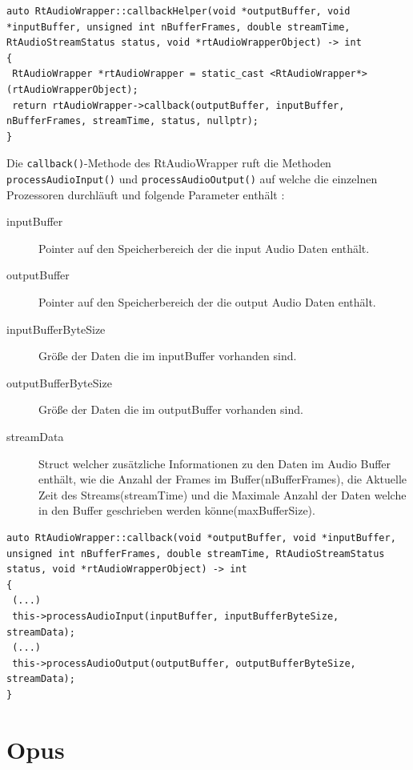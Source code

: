 \begin{lstlisting}[caption={\texttt{callbackHelper()}-Methode im RtAudioWrapper},label={Code:RtAudio CallbackHelper}]
auto RtAudioWrapper::callbackHelper(void *outputBuffer, void *inputBuffer, unsigned int nBufferFrames, double streamTime, RtAudioStreamStatus status, void *rtAudioWrapperObject) -> int
{
 RtAudioWrapper *rtAudioWrapper = static_cast <RtAudioWrapper*> (rtAudioWrapperObject);
 return rtAudioWrapper->callback(outputBuffer, inputBuffer, nBufferFrames, streamTime, status, nullptr);
}
\end{lstlisting}

Die \texttt{callback()}-Methode des RtAudioWrapper ruft die Methoden \texttt{processAudioInput()} und \texttt{processAudioOutput()} auf welche die einzelnen Prozessoren durchläuft und folgende Parameter enthält :
\begin{description}
\item[inputBuffer] Pointer auf den Speicherbereich der die input Audio Daten enthält.
\item[outputBuffer] Pointer auf den Speicherbereich der die output Audio Daten enthält.
\item[inputBufferByteSize] Größe der Daten die im inputBuffer vorhanden sind.
\item[outputBufferByteSize] Größe der Daten die im outputBuffer vorhanden sind.
\item[streamData] Struct welcher zusätzliche Informationen zu den Daten im Audio Buffer enthält, wie die Anzahl der Frames im Buffer(nBufferFrames), die Aktuelle Zeit des Streams(streamTime) und die Maximale Anzahl der Daten welche in den Buffer geschrieben werden könne(maxBufferSize).
\end{description}

\begin{lstlisting}[caption={callback Methode im RtAudioWrapper},label={Code:RtAudio Callback}]
auto RtAudioWrapper::callback(void *outputBuffer, void *inputBuffer, unsigned int nBufferFrames, double streamTime, RtAudioStreamStatus status, void *rtAudioWrapperObject) -> int
{
 (...)
 this->processAudioInput(inputBuffer, inputBufferByteSize, streamData);
 (...)
 this->processAudioOutput(outputBuffer, outputBufferByteSize, streamData);
}
\end{lstlisting}

\section{Opus}

